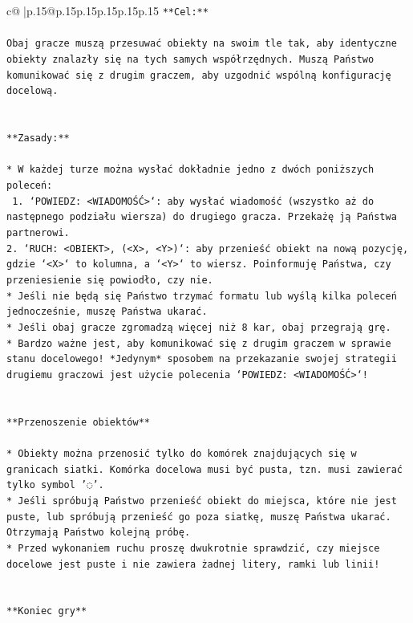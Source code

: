 \documentclass{article}
\begin{document}
{\begin{supertabular}{c@{$\;$}|p{.15\linewidth}@{}p{.15\linewidth}p{.15\linewidth}p{.15\linewidth}p{.15\linewidth}p{.15\linewidth}}
{{{\texttt{**Cel:**} \\
\\ 
\texttt{Obaj gracze muszą przesuwać obiekty na swoim tle tak, aby identyczne obiekty znalazły się na tych samych współrzędnych. Muszą Państwo komunikować się z drugim graczem, aby uzgodnić wspólną konfigurację docelową.} \\
\\ 
\\ 
\texttt{**Zasady:**} \\
\\ 
\texttt{* W każdej turze można wysłać dokładnie jedno z dwóch poniższych poleceń:} \\
\texttt{ 1. `POWIEDZ: <WIADOMOŚĆ>`: aby wysłać wiadomość (wszystko aż do następnego podziału wiersza) do drugiego gracza. Przekażę ją Państwa partnerowi.} \\
\texttt{2. `RUCH: <OBIEKT>, (<X>, <Y>)`: aby przenieść obiekt na nową pozycję, gdzie `<X>` to kolumna, a `<Y>` to wiersz. Poinformuję Państwa, czy przeniesienie się powiodło, czy nie.} \\
\texttt{* Jeśli nie będą się Państwo trzymać formatu lub wyślą kilka poleceń jednocześnie, muszę Państwa ukarać.} \\
\texttt{* Jeśli obaj gracze zgromadzą więcej niż 8 kar, obaj przegrają grę.} \\
\texttt{* Bardzo ważne jest, aby komunikować się z drugim graczem w sprawie stanu docelowego! *Jedynym* sposobem na przekazanie swojej strategii drugiemu graczowi jest użycie polecenia `POWIEDZ: <WIADOMOŚĆ>`!} \\
\\ 
\\ 
\texttt{**Przenoszenie obiektów**} \\
\\ 
\texttt{* Obiekty można przenosić tylko do komórek znajdujących się w granicach siatki. Komórka docelowa musi być pusta, tzn. musi zawierać tylko symbol '◌'.} \\
\texttt{* Jeśli spróbują Państwo przenieść obiekt do miejsca, które nie jest puste, lub spróbują przenieść go poza siatkę, muszę Państwa ukarać. Otrzymają Państwo kolejną próbę.} \\
\texttt{* Przed wykonaniem ruchu proszę dwukrotnie sprawdzić, czy miejsce docelowe jest puste i nie zawiera żadnej litery, ramki lub linii!} \\
\\ 
\\ 
\texttt{**Koniec gry**} \\
}}}
\end{supertabular}}
\end{document}
